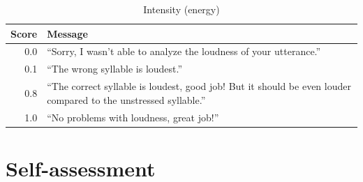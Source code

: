 \begin{table}
			\vspace{1.5em}
			
			\begin{subtable}{\textwidth}
				\centering
				\caption{Intensity (energy)}
				\begin{tabularx}{\textwidth}{rX}
					\toprule
					Score & Message \\
					\midrule 
					 0.0 & ``Sorry, I wasn't able to analyze the loudness of your utterance.'' \\
					 0.1 & ``The wrong syllable is loudest.'' \\
					0.8 & ``The correct syllable is loudest, good job! But it should be even louder compared to the unstressed syllable.'' \\
					1.0 & ``No problems with loudness, great job!'' \\
					\bottomrule
				\end{tabularx}
				\label{tab:explicit:messages:int}
			\end{subtable}	
			
			\label{tab:explicit:messages}
		\end{table}
		
		
		
	
		\section{Self-assessment}
		\label{sec:other:selfassess}
		
		

